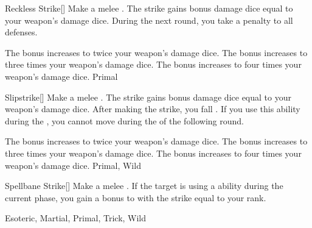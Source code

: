 \lowercase{\hypertarget{maneuver:Reckless Strike}{}}\label{maneuver:Reckless Strike}
\hypertarget{maneuver:Reckless Strike}{}
\begin{freeability}[Rank 2]{Reckless Strike}[]
Make a melee .
The strike gains bonus damage dice equal to your weapon's damage dice.
During the next round, you take a  penalty to all defenses.

\rankline
{} The bonus increases to twice your weapon's damage dice.
 The bonus increases to three times your weapon's damage dice.
 The bonus increases to four times your weapon's damage dice.
 Primal
\end{freeability}
\vspace{0.25em}



\lowercase{\hypertarget{maneuver:Slipstrike}{}}\label{maneuver:Slipstrike}
\hypertarget{maneuver:Slipstrike}{}
\begin{freeability}[Rank 2]{Slipstrike}[]
Make a melee .
The strike gains bonus damage dice equal to your weapon's damage dice.
After making the strike, you fall .
If you use this ability during the , you cannot move during the  of the following round.

\rankline
{} The bonus increases to twice your weapon's damage dice.
 The bonus increases to three times your weapon's damage dice.
 The bonus increases to four times your weapon's damage dice.
 Primal, Wild
\end{freeability}
\vspace{0.25em}



\lowercase{\hypertarget{maneuver:Spellbane Strike}{}}\label{maneuver:Spellbane Strike}
\hypertarget{maneuver:Spellbane Strike}{}
\begin{freeability}[Rank 2]{Spellbane Strike}[]
Make a melee .
If the target is using a  ability during the current phase, you gain a bonus to  with the strike equal to your rank.


 Esoteric, Martial, Primal, Trick, Wild
\end{freeability}
\vspace{0.25em}



